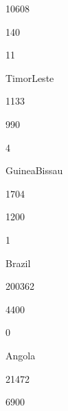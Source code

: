 \documentclass[letterpaper,10pt,english]{sphinxmanual}
\begin{document}
10608





140









11





Timor\sphinxhyphen{}Leste





1133





990









4





Guinea\sphinxhyphen{}Bissau





1704





1200









1





Brazil





200362





4400









0





Angola





21472





6900
\end{document}
